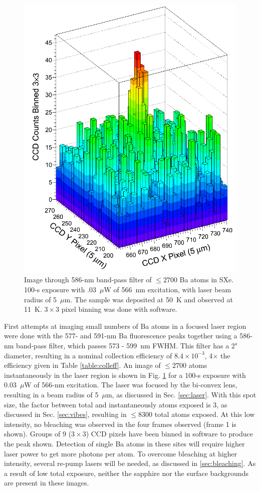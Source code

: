 \begin{figure} %
        \centering
                \includegraphics[width=.6\textwidth]{figures/image_1e4.png}
                \caption{Image through 586-nm band-pass filter of $\leq 2700$ Ba atoms in SXe.  100-s exposure with .03~$\mu$W of 566~nm excitation, with laser beam radius of 5~$\mu$m.  The sample was deposited at 50~K and observed at 11~K.  $3 \times 3$ pixel binning was done with software.}
\label{fig:image590s}
\end{figure}

First attempts at imaging small numbers of Ba atoms in a focused laser region were done with the 577- and 591-nm Ba fluorescence peaks together using a 586-nm band-pass filter, which passes 573 - 599~nm FWHM.  This filter has a 2" diameter, resulting in a nominal collection efficiency of $8.4 \times 10^{-3}$, 4$\times$ the efficiency given in Table \ref{table:colleff}.  An image of $\leq 2700$ atoms instantaneously in the laser region is shown in Fig. \ref{fig:image590s} for a 100-s exposure with 0.03~$\mu$W of 566-nm excitation.  The laser was focused by the bi-convex lens, resulting in a beam radius of 5~$\mu$m, as discussed in Sec. \ref{sec:laser}.  With this spot size, the factor between total and instantaneously atoms exposed is 3, as discussed in Sec. \ref{sec:vibes}, resulting in $\leq 8300$ total atoms exposed.  At this low intensity, no bleaching was observed in the four frames observed (frame 1 is shown).  Groups of 9 ($3 \times 3$) CCD pixels have been binned in software to produce the peak shown.  Detection of single Ba atoms in these sites will require higher laser power to get more photons per atom.  To overcome bleaching at higher intensity, several re-pump lasers will be needed, as discussed in \ref{sec:bleaching}.  As a result of low total exposure, neither the sapphire nor the surface backgrounds are present in these images. 

